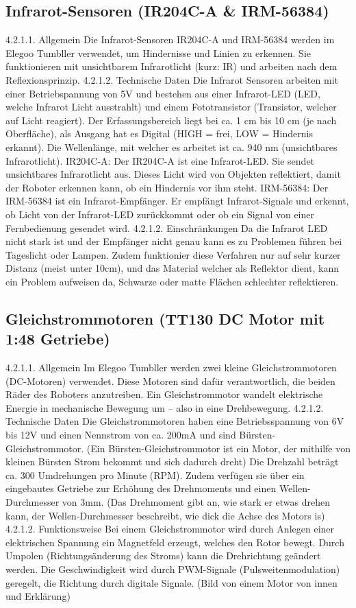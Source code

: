 \subsection{Infrarot-Sensoren (IR204C-A & IRM-56384)}
%
4.2.1.1. Allgemein
Die Infrarot-Sensoren IR204C-A und IRM-56384 werden im Elegoo Tumbller verwendet, um Hindernisse und Linien zu erkennen.
Sie funktionieren mit unsichtbarem Infrarotlicht (kurz: IR) und arbeiten nach dem Reflexionsprinzip.
4.2.1.2. Technische Daten
Die Infrarot Sensoren arbeiten mit einer Betriebspannung von 5V und bestehen aus einer Infrarot-LED (LED, welche Infrarot Licht ausstrahlt) und einem Fototransistor (Transistor, welcher auf Licht reagiert). Der Erfassungsbereich liegt bei ca. 1 cm bis 10 cm (je nach Oberfläche), als Ausgang hat es Digital (HIGH = frei, LOW = Hindernis erkannt). Die Wellenlänge, mit welcher es arbeitet ist ca. 940 nm (unsichtbares Infrarotlicht).
IR204C-A:
Der IR204C-A ist eine Infrarot-LED. Sie sendet unsichtbares Infrarotlicht aus. Dieses Licht wird von Objekten reflektiert, damit der Roboter erkennen kann, ob ein Hindernis vor ihm steht.
IRM-56384:
Der IRM-56384 ist ein Infrarot-Empfänger. Er empfängt Infrarot-Signale und erkennt, ob Licht von der Infrarot-LED zurückkommt oder ob ein Signal von einer Fernbedienung gesendet wird.
4.2.1.2. Einschränkungen
Da die Infrarot LED nicht stark ist  und der Empfänger nicht genau kann es zu Problemen führen bei Tageslicht oder Lampen. Zudem funktionier diese Verfahren nur auf sehr kurzer Distanz (meist unter 10cm), und das Material welcher als Reflektor dient, kann ein Problem aufweisen da, Schwarze oder matte Flächen schlechter reflektieren.
%
\subsection{Gleichstrommotoren (TT130 DC Motor mit 1:48 Getriebe)}
%
4.2.1.1. Allgemein
Im Elegoo Tumbller werden zwei kleine Gleichstrommotoren (DC-Motoren) verwendet.
Diese Motoren sind dafür verantwortlich, die beiden Räder des Roboters anzutreiben.
Ein Gleichstrommotor wandelt elektrische Energie in mechanische Bewegung um – also in eine Drehbewegung.
4.2.1.2. Technische Daten
Die Gleichstrommotoren haben eine Betriebsspannung von 6V bis 12V und einen Nennstrom von ca. 200mA und sind Bürsten-Gleichstrommotor. (Ein Bürsten-Gleichstrommotor ist ein Motor, der mithilfe von kleinen Bürsten Strom bekommt und sich dadurch dreht) Die Drehzahl beträgt ca. 300 Umdrehungen pro Minute (RPM). Zudem verfügen sie über ein eingebautes Getriebe zur Erhöhung des Drehmoments und einen Wellen-Durchmesser von 3mm. (Das Drehmoment gibt an, wie stark er etwas drehen kann, der Wellen-Durchmesser beschreibt, wie dick die Achse des Motors is)
4.2.1.2. Funktionsweise 
Bei einem Gleichstrommotor wird durch Anlegen einer elektrischen Spannung ein Magnetfeld erzeugt, welches den Rotor bewegt. Durch Umpolen (Richtungsänderung des Stroms) kann die Drehrichtung geändert werden. Die Geschwindigkeit wird durch PWM-Signale (Pulsweitenmodulation) geregelt, die Richtung durch digitale Signale.
(Bild von einem Motor von innen und Erklärung)
%
